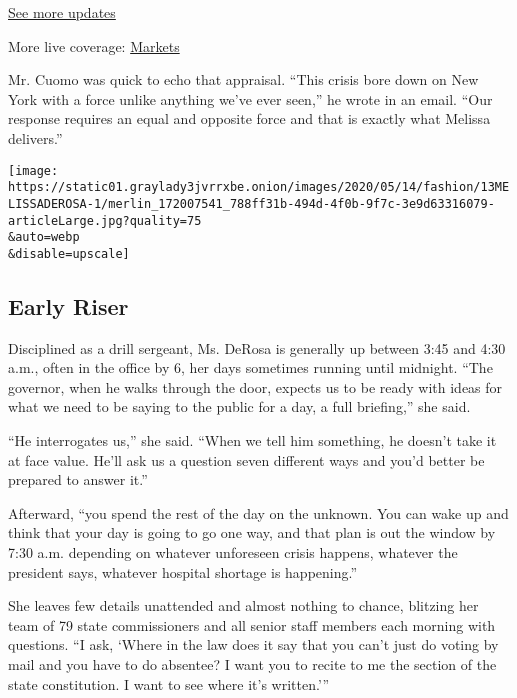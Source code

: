 \href{https://www.nytimes3xbfgragh.onion/2020/09/08/world/covid-19-coronavirus.html?action=click\&pgtype=Article\&state=default\&region=MAIN_CONTENT_1\&context=storylines_live_updates}{See
more updates}

More live coverage:
\href{https://www.nytimes3xbfgragh.onion/live/2020/09/08/business/stock-market-today-coronavirus?action=click\&pgtype=Article\&state=default\&region=MAIN_CONTENT_1\&context=storylines_live_updates}{Markets}

Mr. Cuomo was quick to echo that appraisal. ``This crisis bore down on
New York with a force unlike anything we've ever seen,'' he wrote in an
email. ``Our response requires an equal and opposite force and that is
exactly what Melissa delivers.''

\texttt{[image: https://static01.graylady3jvrrxbe.onion/images/2020/05/14/fashion/13MELISSADEROSA-1/merlin\_172007541\_788ff31b-494d-4f0b-9f7c-3e9d63316079-articleLarge.jpg?quality=75\\\&auto=webp\\\&disable=upscale]}

\hypertarget{early-riser}{%
\subsection{Early Riser}\label{early-riser}}

Disciplined as a drill sergeant, Ms. DeRosa is generally up between 3:45
and 4:30 a.m., often in the office by 6, her days sometimes running
until midnight. ``The governor, when he walks through the door, expects
us to be ready with ideas for what we need to be saying to the public
for a day, a full briefing,'' she said.

``He interrogates us,'' she said. ``When we tell him something, he
doesn't take it at face value. He'll ask us a question seven different
ways and you'd better be prepared to answer it.''

Afterward, ``you spend the rest of the day on the unknown. You can wake
up and think that your day is going to go one way, and that plan is out
the window by 7:30 a.m. depending on whatever unforeseen crisis happens,
whatever the president says, whatever hospital shortage is happening.''

She leaves few details unattended and almost nothing to chance, blitzing
her team of 79 state commissioners and all senior staff members each
morning with questions. ``I ask, `Where in the law does it say that you
can't just do voting by mail and you have to do absentee? I want you to
recite to me the section of the state constitution. I want to see where
it's written.'''

